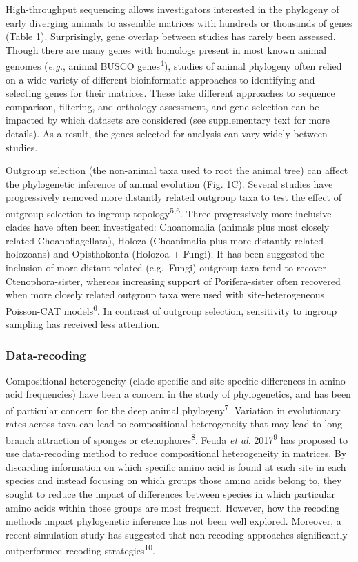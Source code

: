 \documentclass[]{article}
\begin{document}
High-throughput sequencing allows investigators interested in the
phylogeny of early diverging animals to assemble matrices with hundreds
or thousands of genes (Table 1). Surprisingly, gene overlap between
studies has rarely been assessed. Though there are many genes with
homologs present in most known animal genomes (\emph{e.g.}, animal BUSCO
genes\textsuperscript{4}), studies of animal phylogeny often relied on a
wide variety of different bioinformatic approaches to identifying and
selecting genes for their matrices. These take different approaches to
sequence comparison, filtering, and orthology assessment, and gene
selection can be impacted by which datasets are considered (see
supplementary text for more details). As a result, the genes selected
for analysis can vary widely between studies.

Outgroup selection (the non-animal taxa used to root the animal tree)
can affect the phylogenetic inference of animal evolution (Fig. 1C).
Several studies have progressively removed more distantly related
outgroup taxa to test the effect of outgroup selection to ingroup
topology\textsuperscript{5,6}. Three progressively more inclusive clades
have often been investigated: Choanomalia (animals plus most closely
related Choanoflagellata), Holoza (Choanimalia plus more distantly
related holozoans) and Opisthokonta (Holozoa + Fungi). It has been
suggested the inclusion of more distant related (e.g.~Fungi) outgroup
taxa tend to recover Ctenophora-sister, whereas increasing support of
Porifera-sister often recovered when more closely related outgroup taxa
were used with site-heterogeneous Poisson-CAT models\textsuperscript{6}.
In contrast of outgroup selection, sensitivity to ingroup sampling has
received less attention.

\hypertarget{data-recoding}{%
\subsubsection{Data-recoding}\label{data-recoding}}

Compositional heterogeneity (clade-specific and site-specific
differences in amino acid frequencies) have been a concern in the study
of phylogenetics, and has been of particular concern for the deep animal
phylogeny\textsuperscript{7}. Variation in evolutionary rates across
taxa can lead to compositional heterogeneity that may lead to long
branch attraction of sponges or ctenophores\textsuperscript{8}. Feuda
\emph{et al}. 2017\textsuperscript{9} has proposed to use data-recoding
method to reduce compositional heterogeneity in matrices. By discarding
information on which specific amino acid is found at each site in each
species and instead focusing on which groups those amino acids belong
to, they sought to reduce the impact of differences between species in
which particular amino acids within those groups are most frequent.
However, how the recoding methods impact phylogenetic inference has not
been well explored. Moreover, a recent simulation study has suggested
that non-recoding approaches significantly outperformed recoding
strategies\textsuperscript{10}.
\end{document}
